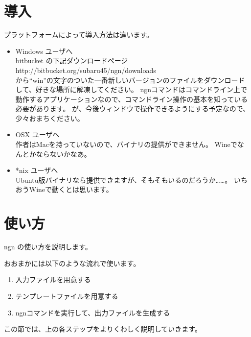 \documentclass[a4j]{jsarticle}
\begin{document}
\section{導入}
\label{sec:installation}

プラットフォームによって導入方法は違います。

\begin{itemize}
\item Windows ユーザへ\\
  bitbucket の下記ダウンロードページ \\
  http://bitbucket.org/subaru45/ngn/downloads \\
  から``win''の文字のついた一番新しいバージョンのファイルをダウンロードして、好きな場所に解凍してください。
  ngnコマンドはコマンドライン上で動作するアプリケーションなので、コマンドライン操作の基本を知っている必要があります。
  が、今後ウィンドウで操作できるようにする予定なので、少々おまちください。\\

\item OSX ユーザへ\\
  作者はMacを持っていないので、バイナリの提供ができません。
  Wineでなんとかならないかなあ。\\

\item *nix ユーザへ\\
  Ubuntu版バイナリなら提供できますが、そもそもいるのだろうか……。
  いちおうWineで動くとは思います。

\end{itemize}



\section{使い方}
\label{sec:howtouse}

ngn の使い方を説明します。

おおまかには以下のような流れで使います。

\begin{enumerate}
  \item 入力ファイルを用意する \label{enum:input}
  \item テンプレートファイルを用意する \label{enum:template}
  \item ngnコマンドを実行して、出力ファイルを生成する \label{enum:command}
\end{enumerate}

この節では、上の各ステップをよりくわしく説明していきます。
\end{document}
